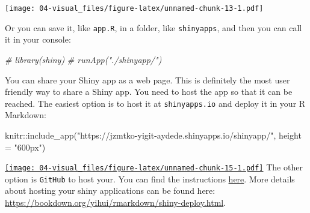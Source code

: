 \documentclass[
]{book}
\newenvironment{Shaded}{\begin{snugshade}}{\end{snugshade}}
\newcommand{\AttributeTok}[1]{\textcolor[rgb]{0.77,0.63,0.00}{#1}}
\newcommand{\CommentTok}[1]{\textcolor[rgb]{0.56,0.35,0.01}{\textit{#1}}}
\newcommand{\FunctionTok}[1]{\textcolor[rgb]{0.00,0.00,0.00}{#1}}
\newcommand{\NormalTok}[1]{#1}
\newcommand{\SpecialCharTok}[1]{\textcolor[rgb]{0.00,0.00,0.00}{#1}}
\newcommand{\StringTok}[1]{\textcolor[rgb]{0.31,0.60,0.02}{#1}}
\begin{document}
\begin{Shaded}
\end{Shaded}

\texttt{[image: 04-visual\_files/figure-latex/unnamed-chunk-13-1.pdf]}

Or you can save it, like \texttt{app.R}, in a folder, like \texttt{shinyapps}, and then you can call it in your console:

\begin{Shaded}
\begin{Highlighting}[]
\CommentTok{\# library(shiny)}
\CommentTok{\# runApp("./shinyapp/")}
\end{Highlighting}
\end{Shaded}

You can share your Shiny app as a web page. This is definitely the most user friendly way to share a Shiny app. You need to host the app so that it can be reached. The easiest option is to host it at \texttt{shinyapps.io} and deploy it in your R Markdown:

\begin{Shaded}
\begin{Highlighting}[]
\NormalTok{knitr}\SpecialCharTok{::}\FunctionTok{include\_app}\NormalTok{(}\StringTok{"https://jzmtko{-}yigit{-}aydede.shinyapps.io/shinyapp/"}\NormalTok{,}
  \AttributeTok{height =} \StringTok{"600px"}\NormalTok{)}
\end{Highlighting}
\end{Shaded}

\href{https://jzmtko-yigit-aydede.shinyapps.io/shinyapp/}{\texttt{[image: 04-visual\_files/figure-latex/unnamed-chunk-15-1.pdf]}}
The other option is \texttt{GitHub} to host your. You can find the instructions \href{https://www.youtube.com/watch?v=zIRNv3kH79w}{here}. More details about hosting your shiny applications can be found here: \url{https://bookdown.org/yihui/rmarkdown/shiny-deploy.html}.
\end{document}
